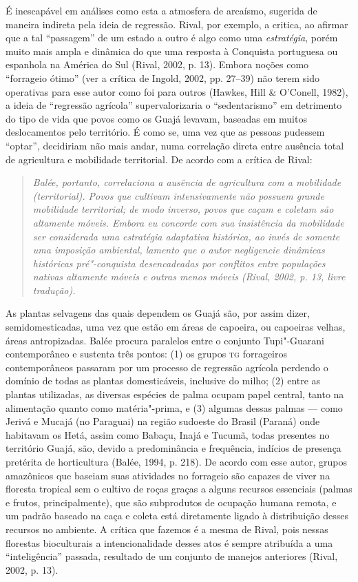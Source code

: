 É inescapável em análises como esta a atmosfera de arcaísmo, sugerida de
maneira indireta pela ideia de regressão. Rival, por exemplo, a critica,
ao afirmar que a tal ``passagem'' de um estado a outro é algo como uma
\emph{estratégia}, porém muito mais ampla e dinâmica do que uma resposta
à Conquista portuguesa ou espanhola na América do Sul (Rival, 2002, p. 13).
Embora noções como ``forrageio ótimo'' (ver a crítica de Ingold, 2002,
pp. 27--39) não terem sido operativas para esse autor como foi para outros
(Hawkes, Hill \& O'Conell, 1982), a ideia de ``regressão agrícola''
supervalorizaria o ``sedentarismo'' em detrimento do tipo de vida que
povos como os Guajá levavam, baseadas em muitos deslocamentos pelo
território. É como se, uma vez que as pessoas pudessem ``optar'',
decidiriam não mais andar, numa correlação direta entre ausência total
de agricultura e mobilidade territorial. De acordo com a crítica de
Rival:

\begin{quote}
\emph{Balée, portanto, correlaciona a ausência de agricultura com a
mobilidade (territorial). Povos que cultivam intensivamente não possuem
grande mobilidade territorial; de modo inverso, povos que caçam e
coletam são altamente móveis. Embora eu concorde com sua insistência da
mobilidade ser considerada uma estratégia adaptativa histórica, ao invés
de somente uma imposição ambiental, lamento que o autor negligencie
dinâmicas históricas pré"-conquista desencadeadas por conflitos entre
populações nativas altamente móveis e outras menos móveis (Rival, 2002, p.
13, livre tradução).}
\end{quote}

As plantas selvagens das quais dependem os Guajá são, por assim dizer,
semidomesticadas, uma vez que estão em áreas de capoeira, ou capoeiras
velhas, áreas antropizadas. Balée procura paralelos entre o conjunto
Tupi"-Guarani contemporâneo e sustenta três pontos: (1) os grupos \textsc{tg}
forrageiros contemporâneos passaram por um processo de regressão
agrícola perdendo o domínio de todas as plantas domesticáveis, inclusive
do milho; (2) entre as plantas utilizadas, as diversas espécies de palma
ocupam papel central, tanto na alimentação quanto como matéria"-prima, e
(3) algumas dessas palmas --- como Jerivá e Mucajá (no Paraguai) na região
sudoeste do Brasil (Paraná) onde habitavam os Hetá, assim como Babaçu,
Inajá e Tucumã, todas presentes no território Guajá, são, devido a
predominância e frequência, indícios de presença pretérita de
horticultura (Balée, 1994, p. 218). De acordo com esse autor, grupos
amazônicos que baseiam suas atividades no forrageio são capazes de viver
na floresta tropical sem o cultivo de roças graças a alguns recursos
essenciais (palmas e frutos, principalmente), que são subprodutos de
ocupação humana remota, e um padrão baseado na caça e coleta está
diretamente ligado à distribuição desses recursos no ambiente. A crítica
que fazemos é a mesma de Rival, pois nessas florestas bioculturais a
intencionalidade desses atos é sempre atribuída a uma ``inteligência''
passada, resultado de um conjunto de manejos anteriores (Rival, 2002, p.
13).


